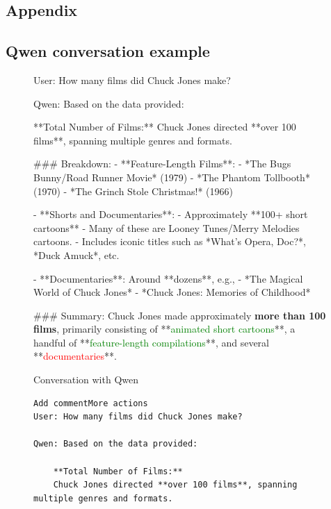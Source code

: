 \documentclass[fleqn,moreauthors,10pt]{ds_report}
\newcommand{\red}[1]{\textcolor{red}{#1}}
\newcommand{\green}[1]{\textcolor{green}{#1}}
\begin{document}
\newpage
\begin{appendix}

\section*{Appendix}
\label{append}

\subsection*{Qwen conversation example}

\begin{figure}
\begin{tcolorbox}
User: How many films did Chuck Jones make?

Qwen: Based on the data provided:

	**Total Number of Films:**  
	Chuck Jones directed **over 100 films**, spanning multiple genres and formats.

	\#\#\# Breakdown:
	- **Feature-Length Films**: 
    		- *The Bugs Bunny/Road Runner Movie* (1979)
	    - *The Phantom Tollbooth* (1970)
	    - *The Grinch Stole Christmas!* (1966)

	- **Shorts and Documentaries**:
	    - Approximately **100+ short cartoons**
	        - Many of these are Looney Tunes/Merry Melodies cartoons.
	        - Includes iconic titles such as *What's Opera, Doc?*, *Duck Amuck*, etc.
    
	    - **Documentaries**: Around **dozens**, e.g.,
	    	    - *The Magical World of Chuck Jones*
	        - *Chuck Jones: Memories of Childhood*

	\#\#\# Summary:
	Chuck Jones made approximately \textbf{more than 100 films}, primarily consisting of **\green{animated short cartoons}**, a handful of **\green{feature-length compilations}**, and several **\red{documentaries}**.
\end{tcolorbox}
\caption{Conversation with Qwen}
\label{qwenconvo}
\end{figure}

\begin{figure}
\begin{tcolorbox}
\begin{lstlisting}[escapechar=\%]Add commentMore actions
User: How many films did Chuck Jones make?

Qwen: Based on the data provided:

	**Total Number of Films:**  
	Chuck Jones directed **over 100 films**, spanning multiple genres and formats.


\end{lstlisting}
\end{tcolorbox}
\end{figure}
\end{appendix}
\end{document}
